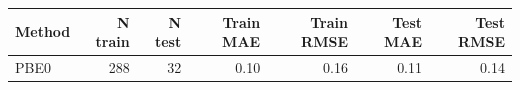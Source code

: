 \begin{table}
    \centering
    \begin{tabular*}{\textwidth}{@{\extracolsep{\fill}} lrrrrrr}
        \hline
        Method & N train & N test & Train MAE & Train RMSE & Test MAE & Test RMSE \\ 
        \hline
        PBE0 & 288 & 32 & 0.10 & 0.16 & 0.11 & 0.14 \\ 
        \hline
    \end{tabular*}
\end{table}
